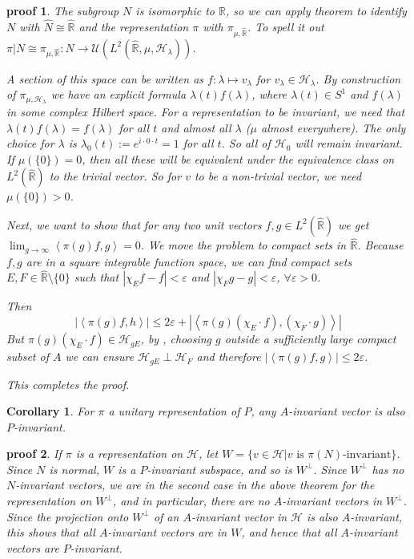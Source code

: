 \documentclass[
  12pt
]{article}
\theoremstyle{plain}
\newtheorem{cor}[thm]{Corollary}
\newtheorem*{pf}{proof}
\newcommand{\mpi}{\ensuremath{\pi}\xspace}
\newcommand{\bbr}{\ensuremath{\mathbb{R}}\xspace}
\newcommand{\hilb}{\ensuremath{\mathscr{H}}\xspace}
\newcommand{\abs}[1]{| #1 |}
\newcommand{\inn}[1]{\left\langle #1 \right\rangle}
\begin{document}
  \begin{pf}
    The subgroup $N$ is isomorphic to \bbr, so we can apply theorem 
    to identify $N$ with $\hat{N} \cong \hat{\bbr}$ and the representation \mpi with $\pi_{\mu, \hat{\bbr}}$.
    To spell it out $\pi|N \cong \pi_{\mu, \hat{\bbr}}: N \rightarrow \mathcal{U}(L^2(\hat{\bbr}, \mu, \hilb_{\lambda}))$.

    A section of this space can be written as $f: \lambda \mapsto v_{\lambda}$ for $v_{\lambda} \in \hilb_{\lambda}$.
    By construction of $\pi_{\mu, \hilb_{\lambda}}$ we have an explicit formula $\lambda(t)f(\lambda)$, where $\lambda(t) \in S^1$ and $f(\lambda)$ in some complex Hilbert space.
    For a representation to be invariant, we need that $\lambda(t)f(\lambda) = f(\lambda)$ for all $t$ and almost all $\lambda$ ($\mu$ almost everywhere).
    The only choice for $\lambda$ is $\lambda_0(t) := e^{i \cdot 0 \cdot t} = 1$ for all $t$.
    So all of $\hilb_0$ will remain invariant.
    If $\mu(\{0\}) = 0$, then all these will be equivalent under the equivalence class on $L^2(\hat{\bbr})$ to the trivial vector.
    So for $v$ to be a non-trivial vector, we need $\mu(\{0\}) > 0$.

    Next, we want to show that for any two unit vectors $f, g \in L^2(\hat{\bbr})$ we get $\lim_{g\to\infty} \inn{\pi(g)f,g} = 0$.
    We move the problem to compact sets in $\hat{\bbr}$.
    Because $f,g$ are in a square integrable function space, we can find
    compact sets $E, F \in \hat{\bbr}\setminus \{0\}$ such that $\abs{\chi_Ef -
    f} < \varepsilon$ and $\abs{\chi_Fg -g} < \varepsilon$, $\forall
    \varepsilon > 0$.

    Then
    $$
    \abs{\inn{\pi(g)f, h}} \leq 2\varepsilon + \abs{\inn{\pi(g)(\chi_E\cdot f), (\chi_F \cdot g)}}
    $$
    But $\pi(g)(\chi_E\cdot f) \in \hilb_{gE}$, by , choosing $g$ outside a sufficiently large compact subset of $A$ we can ensure $\hilb_{gE}\perp \hilb_{F}$ and therefore $\abs{\inn{\pi(g)f, g}} \leq 2\varepsilon$.

    This completes the proof.

  \end{pf}

  \begin{cor}
    \label{cor:2.3.7}
    For \mpi a unitary representation of $P$, any $A$-invariant vector is also $P$-invariant.
  \end{cor}

  \begin{pf}
    If \mpi is a representation on \hilb, let $W=\{v \in \hilb|v \text{ is } \pi(N)\text{-invariant}\}$.
    Since $N$ is normal, $W$ is a $P$-invariant subspace, and so is $W^{\perp}$. 
    Since $W^{\perp}$ has no $N$-invariant vectors, we are in the second case
    in the above theorem for the representation on $W^{\perp}$, and in
    particular, there are no $A$-invariant vectors in $W^{\perp}$. Since the
    projection onto $W^{\perp}$ of an $A$-invariant vector in \hilb is also
    $A$-invariant, this shows that all $A$-invariant vectors are in $W$, and
    hence that all $A$-invariant vectors are $P$-invariant.
  \end{pf}
\end{document}
